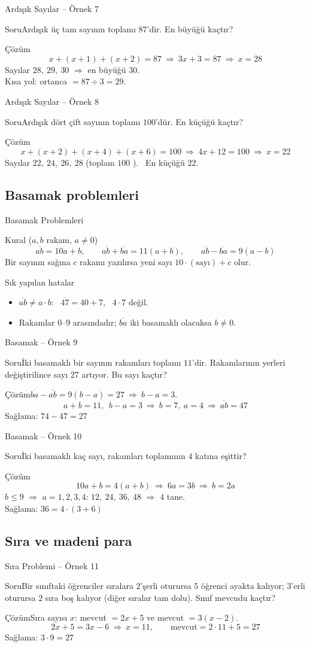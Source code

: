 \documentclass[aspectratio=169,11pt]{beamer}
\newcommand{\soru}[3]{%
\begin{frame}{#1}
  \begin{block}{Soru}\large #2\end{block}
  \pause
  \begin{exampleblock}{Çözüm}\large #3\end{exampleblock}
\end{frame}}
\newcommand{\ab}[1]{\overline{#1}}
\begin{document}
\soru{Ardışık Sayılar -- Örnek 7}
{Ardışık üç tam sayının toplamı \(87\)'dir. En büyüğü kaçtır?}
{\[x+(x+1)+(x+2)=87\ \Rightarrow\ 3x+3=87\ \Rightarrow\ x=28\]
Sayılar \(28,\ 29,\ 30\) \(\Rightarrow\) en büyüğü \(30\).\\[3pt]
Kısa yol: ortanca \(=87\div 3=29\).}

\soru{Ardışık Sayılar -- Örnek 8}
{Ardışık dört çift sayının toplamı \(100\)'dür. En küçüğü kaçtır?}
{\[x+(x+2)+(x+4)+(x+6)=100\ \Rightarrow\ 4x+12=100\ \Rightarrow\ x=22\]
Sayılar \(22,\ 24,\ 26,\ 28\) \quad (toplam \(100\) \checkmark). \ En küçüğü \(22\).}

\subsection{Basamak problemleri}
\begin{frame}{Basamak Problemleri}
\begin{block}{Kural (\(a,b\) rakam, \(a\neq 0\))}
\[\ab{ab}=10a+b,\qquad \ab{ab}+\ab{ba}=11(a+b),\qquad \ab{ab}-\ab{ba}=9(a-b)\]
Bir sayının sağına \(c\) rakamı yazılırsa yeni sayı \(10\cdot(\text{sayı})+c\) olur.
\end{block}
\begin{alertblock}{Sık yapılan hatalar}
\begin{itemize}
\item \(\ab{ab}\neq a\cdot b\): \ \(\ab{47}=40+7\), \ \(4\cdot 7\) değil.
\item Rakamlar \(0\)--\(9\) arasındadır; \(\ab{ba}\) iki basamaklı olacaksa \(b\neq 0\).
\end{itemize}
\end{alertblock}
\end{frame}

\soru{Basamak -- Örnek 9}
{İki basamaklı bir sayının rakamları toplamı \(11\)'dir. Rakamlarının yerleri değiştirilince sayı \(27\) artıyor. Bu sayı kaçtır?}
{\(\ab{ba}-\ab{ab}=9(b-a)=27\ \Rightarrow\ b-a=3\).
\[a+b=11,\ \ b-a=3\ \Rightarrow\ b=7,\ a=4\ \Rightarrow\ \ab{ab}=47\]
Sağlama: \(74-47=27\) \checkmark}

\soru{Basamak -- Örnek 10}
{İki basamaklı kaç sayı, rakamları toplamının \(4\) katına eşittir?}
{\[10a+b=4(a+b)\ \Rightarrow\ 6a=3b\ \Rightarrow\ b=2a\]
\(b\le 9\) \(\Rightarrow\) \(a=1,2,3,4\): \quad \(12,\ 24,\ 36,\ 48\) \(\Rightarrow\) \(4\) tane.\\[3pt]
Sağlama: \(36=4\cdot(3+6)\) \checkmark}

\subsection{Sıra ve madeni para}
\soru{Sıra Problemi -- Örnek 11}
{Bir sınıftaki öğrenciler sıralara \(2\)'şerli oturursa \(5\) öğrenci ayakta kalıyor; \(3\)'erli oturursa \(2\) sıra boş kalıyor (diğer sıralar tam dolu). Sınıf mevcudu kaçtır?}
{Sıra sayısı \(x\): \quad mevcut \(=2x+5\) \quad ve \quad mevcut \(=3(x-2)\).
\[2x+5=3x-6\ \Rightarrow\ x=11,\qquad \text{mevcut}=2\cdot 11+5=27\]
Sağlama: \(3\cdot 9=27\) \checkmark}
\end{document}
